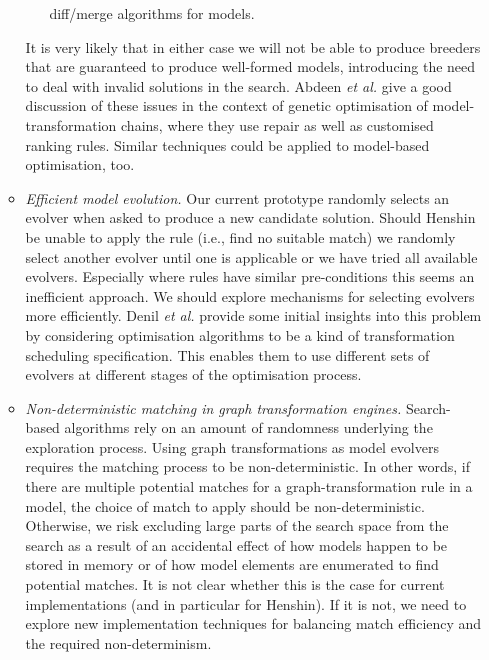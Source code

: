 \begin{itemize}
\begin{itemize}
\begin{enumerate}
													diff/merge algorithms for models.
									\end{enumerate}
									It is very likely that in either case we will not be able to produce breeders that are guaranteed to produce well-formed models, introducing the need to deal with invalid solutions
									in the search. Abdeen \emph{et al.} \cite{Abdeen+14} give a good discussion of these issues in the context of genetic optimisation of model-transformation chains, where they use
									repair as well as customised ranking rules. Similar techniques could be applied to model-based optimisation, too.
									
						\item \emph{Efficient model evolution.} Our current prototype randomly selects an evolver when asked to produce a new candidate solution. Should Henshin be unable to apply the rule 
						      (i.e., find no suitable match) we randomly select another evolver until one is applicable or we have tried all available evolvers. Especially where rules have similar 
									pre-conditions this seems an inefficient approach. We should explore mechanisms for selecting evolvers more efficiently. Denil \emph{et al.} \cite{Denil+14} provide some initial
									insights into this problem by considering optimisation algorithms to be a kind of transformation scheduling specification. This enables them to use different sets of evolvers at
									different stages of the optimisation process.

						\item \emph{Non-deterministic matching in graph transformation engines.} Search-based algorithms rely on an amount of randomness underlying the exploration process. Using graph
						      transformations as model evolvers requires the matching process to be non-deterministic. In other words, if there are multiple potential matches for a graph-transformation rule in
									a model, the choice of match to apply should be non-deterministic. Otherwise, we risk excluding large parts of the search space from the search as a result of an accidental effect
									of how models happen to be stored in memory or of how model elements are enumerated to find potential matches. It is not clear whether this is the case for current implementations 
									(and in particular for Henshin). If it is not, we need to explore new implementation techniques for balancing match efficiency and the required non-determinism.
									

\end{itemize}
\end{itemize}
